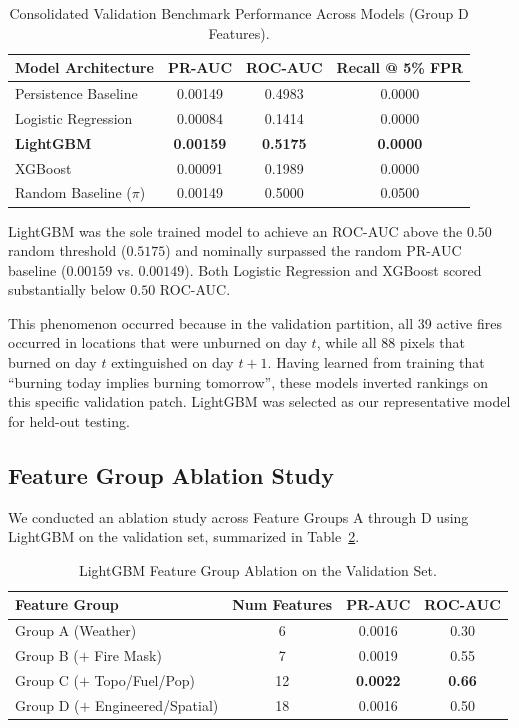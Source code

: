 \documentclass[10pt,journal,compsoc]{IEEEtran}
\begin{document}
\begin{table}[H]
\centering
\caption{Consolidated Validation Benchmark Performance Across Models (Group D Features).}
\label{tab:val_comparison}
\begin{tabular}{lccc}
\toprule
\textbf{Model Architecture} & \textbf{PR-AUC} & \textbf{ROC-AUC} & \textbf{Recall @ 5\% FPR} \\
\midrule
Persistence Baseline & 0.00149 & 0.4983 & 0.0000 \\
Logistic Regression & 0.00084 & 0.1414 & 0.0000 \\
\textbf{LightGBM} & \textbf{0.00159} & \textbf{0.5175} & \textbf{0.0000} \\
XGBoost & 0.00091 & 0.1989 & 0.0000 \\
\midrule
Random Baseline ($\pi$) & 0.00149 & 0.5000 & 0.0500 \\
\bottomrule
\end{tabular}
\end{table}

LightGBM was the sole trained model to achieve an ROC-AUC above the $0.50$ random threshold ($0.5175$) and nominally surpassed the random PR-AUC baseline ($0.00159$ vs. $0.00149$). Both Logistic Regression and XGBoost scored substantially below $0.50$ ROC-AUC. 

This phenomenon occurred because in the validation partition, all 39 active fires occurred in locations that were unburned on day $t$, while all 88 pixels that burned on day $t$ extinguished on day $t+1$. Having learned from training that ``burning today implies burning tomorrow'', these models inverted rankings on this specific validation patch. LightGBM was selected as our representative model for held-out testing.

\subsection{Feature Group Ablation Study}
We conducted an ablation study across Feature Groups A through D using LightGBM on the validation set, summarized in Table~\ref{tab:ablation}.

\begin{table}[H]
\centering
\caption{LightGBM Feature Group Ablation on the Validation Set.}
\label{tab:ablation}
\begin{tabular}{lccc}
\toprule
\textbf{Feature Group} & \textbf{Num Features} & \textbf{PR-AUC} & \textbf{ROC-AUC} \\
\midrule
Group A (Weather) & 6 & 0.0016 & 0.30 \\
Group B ($+$ Fire Mask) & 7 & 0.0019 & 0.55 \\
Group C ($+$ Topo/Fuel/Pop) & 12 & \textbf{0.0022} & \textbf{0.66} \\
Group D ($+$ Engineered/Spatial) & 18 & 0.0016 & 0.50 \\
\bottomrule
\end{tabular}
\end{table}
\end{document}
